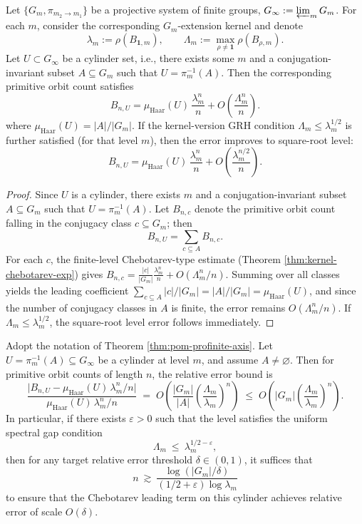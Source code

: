 \begin{theorem}\label{thm:pom-profinite-axis}
Let $\{G_m,\pi_{m_2\to m_1}\}$ be a projective system of finite groups, $G_\infty:=\varprojlim_m G_m$. For each $m$, consider the corresponding $G_m$-extension kernel and denote
$$
\lambda_m:=\rho(B_{\mathbf 1,m}),\qquad
\Lambda_m:=\max_{\rho\neq\mathbf 1}\rho(B_{\rho,m}).
$$
Let \(U\subset G_\infty\) be a cylinder set, i.e., there exists some $m$ and a conjugation-invariant subset $A\subseteq G_m$ such that
\(
U=\pi_m^{-1}(A)
\).
Then the corresponding primitive orbit count satisfies
$$
B_{n,U}
=\mu_{\mathrm{Haar}}(U)\,\frac{\lambda_m^n}{n}
 +O\!\left(\frac{\Lambda_m^n}{n}\right).
$$
where \(\mu_{\mathrm{Haar}}(U)=|A|/|G_m|\).
If the kernel-version GRH condition $\Lambda_m\le \lambda_m^{1/2}$ is further satisfied (for that level $m$), then the error improves to square-root level:
$$
B_{n,U}
=\mu_{\mathrm{Haar}}(U)\,\frac{\lambda_m^n}{n}
 +O\!\left(\frac{\lambda_m^{n/2}}{n}\right).
$$
\end{theorem}
\begin{proof}
Since $U$ is a cylinder, there exists $m$ and a conjugation-invariant subset $A\subseteq G_m$ such that $U=\pi_m^{-1}(A)$. Let $B_{n,c}$ denote the primitive orbit count falling in the conjugacy class $c\subseteq G_m$; then
$$
B_{n,U}=\sum_{c\subseteq A} B_{n,c}.
$$
For each $c$, the finite-level Chebotarev-type estimate (Theorem \ref{thm:kernel-chebotarev-exp}) gives
$
B_{n,c}=\frac{|c|}{|G_m|}\frac{\lambda_m^n}{n}+O(\Lambda_m^n/n)
$.
Summing over all classes yields the leading coefficient
$
\sum_{c\subseteq A}|c|/|G_m|=|A|/|G_m|=\mu_{\mathrm{Haar}}(U)
$, and since the number of conjugacy classes in $A$ is finite, the error remains $O(\Lambda_m^n/n)$. If $\Lambda_m\le \lambda_m^{1/2}$, the square-root level error follows immediately.
\end{proof}

\begin{corollary}\label{cor:pom-profinite-cylinder-effective-n}
Adopt the notation of Theorem \ref{thm:pom-profinite-axis}. Let \(U=\pi_m^{-1}(A)\subseteq G_\infty\) be a cylinder at level \(m\), and assume \(A\neq\varnothing\).
Then for primitive orbit counts of length \(n\), the relative error bound is
\[
\frac{\bigl|B_{n,U}-\mu_{\mathrm{Haar}}(U)\,\lambda_m^n/n\bigr|}{\mu_{\mathrm{Haar}}(U)\,\lambda_m^n/n}
\;=\;
O\!\left(\frac{|G_m|}{|A|}\left(\frac{\Lambda_m}{\lambda_m}\right)^n\right)
\;\le\;
O\!\left(|G_m|\left(\frac{\Lambda_m}{\lambda_m}\right)^n\right).
\]
In particular, if there exists \(\varepsilon>0\) such that the level satisfies the uniform spectral gap condition
\[
\Lambda_m\ \le\ \lambda_m^{1/2-\varepsilon},
\]
then for any target relative error threshold \(\delta\in(0,1)\), it suffices that
\[
\boxed{\;
n\ \gtrsim\ \frac{\log(|G_m|/\delta)}{(1/2+\varepsilon)\log \lambda_m}\; }
\]
to ensure that the Chebotarev leading term on this cylinder achieves relative error of scale \(O(\delta)\).
\end{corollary}

